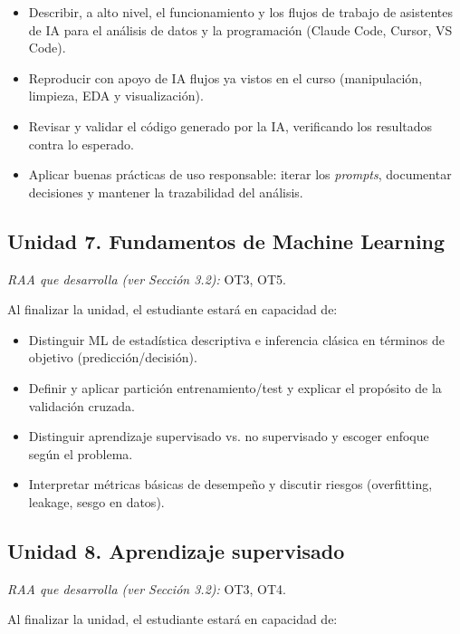 \documentclass[11pt,a4paper]{article}
\begin{document}
\begin{itemize}
    \item Describir, a alto nivel, el funcionamiento y los flujos de trabajo de asistentes de IA para el análisis de datos y la programación (Claude Code, Cursor, VS Code).
    \item Reproducir con apoyo de IA flujos ya vistos en el curso (manipulación, limpieza, EDA y visualización).
    \item Revisar y validar el código generado por la IA, verificando los resultados contra lo esperado.
    \item Aplicar buenas prácticas de uso responsable: iterar los \textit{prompts}, documentar decisiones y mantener la trazabilidad del análisis.
\end{itemize}

\subsection*{Unidad 7. Fundamentos de Machine Learning}

\textit{RAA que desarrolla (ver Sección 3.2):} OT3, OT5.

Al finalizar la unidad, el estudiante estará en capacidad de:

\begin{itemize}
    \item Distinguir ML de estadística descriptiva e inferencia clásica en términos de objetivo (predicción\slash decisión).
    \item Definir y aplicar partición entrenamiento/test y explicar el propósito de la validación cruzada.
    \item Distinguir aprendizaje supervisado vs. no supervisado y escoger enfoque según el problema.
    \item Interpretar métricas básicas de desempeño y discutir riesgos (overfitting, leakage, sesgo en datos).
\end{itemize}

\subsection*{Unidad 8. Aprendizaje supervisado}

\textit{RAA que desarrolla (ver Sección 3.2):} OT3, OT4.

Al finalizar la unidad, el estudiante estará en capacidad de:
\end{document}
